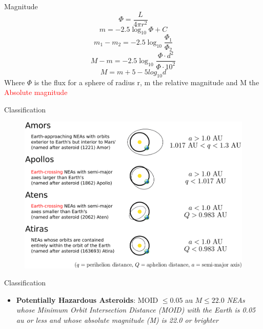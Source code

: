\documentclass{beamer}
\begin{document}
\begin{frame}{Magnitude}
\begin{equation}
\Phi=\frac{L}{4\pi r^{2}}
\end{equation}
\begin{equation}
m=-2.5\log_{10}\Phi+C
\end{equation}
\begin{equation}
m_{1}-m_{2}=-2.5\log_{10}\frac{\Phi_{1}}{\Phi_{2}}
\end{equation}
\begin{equation}
M-m=-2.5\log_{10}\frac{\Phi\cdot d^{2} }{\Phi\cdot 10^{2}}
\end{equation}
\begin{equation}
M=m+5-5log_{10}d
\end{equation}
Where $\Phi$ is the flux for a sphere of radius r, m the relative magnitude and M the \textcolor{red}{Absolute magnitude}
\end{frame}

\begin{frame}{Classification}
\begin{figure}[h]
\begin{center}
\includegraphics[width=\textwidth]{Pic/neo_orbit_types.jpg}
\caption{\cite{nasa_classification}}
\label{Area_dynamics}
\end{center}
\end{figure}
\end{frame}

\begin{frame}{Classification}
\begin{itemize}
\item \textbf{Potentially Hazardous Asteroids}: MOID $\leq 0.05$ au $M \leq22.0$ \textit{NEAs whose Minimum Orbit Intersection Distance (MOID) with the Earth is 0.05 au or less and whose absolute magnitude (M) is 22.0 or brighter}
\end{itemize}
\end{frame}
\end{document}
